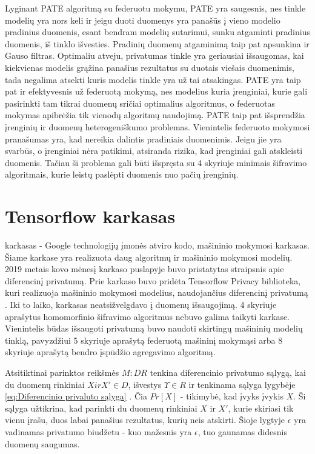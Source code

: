 \documentclass{VUMIFInfBakalaurinis}
\begin{document}
\par Lyginant PATE algoritmą su federuotu mokymu, PATE yra saugesnis, nes tinkle modelių yra nors keli ir jeigu duoti duomenys yra panašūs į vieno modelio pradinius duomenis, esant bendram modelių sutarimui, sunku atgaminti pradinius duomenis, iš tinklo išvesties. Pradinių duomenų atgaminimą taip pat apsunkina ir Gauso filtras. Optimaliu atveju, privatumas tinkle yra geriausiai išsaugomas, kai kiekvienas modelis grąžina panašius rezultatus su duotais viešais duomenimis, tada negalima atsekti kuris modelis tinkle yra už tai atsakingas. PATE yra taip pat ir efektyvesnis už federuotą mokymą, nes modelius kuria įrenginiai, kurie gali pasirinkti tam tikrai duomenų sričiai optimalius algoritmus, o federuotas mokymas apibrėžia tik vienodų algoritmų naudojimą. PATE taip pat išsprendžia įrenginių ir duomenų heterogeniškumo problemas. Vienintelis federuoto mokymosi pranašumas yra, kad nereikia dalintis pradiniais duomenimis. Jeigu jie yra svarbūs, o įrenginiai nėra patikimi, atsiranda rizika, kad įrenginiai gali atskleisti duomenis. Tačiau ši problema gali būti išspręsta su 4 skyriuje minimais šifravimo algoritmais, kurie leistų paslėpti duomenis nuo pačių įrenginių.

\section{Tensorflow karkasas}
\par {} karkasas - Google technologijų įmonės atviro kodo, mašininio mokymosi karkasas. Šiame karkase yra realizuota daug algoritmų ir mašininio mokymosi modelių. 2019 metais kovo mėnesį  karkaso puslapyje buvo pristatytas straipsnis apie diferencinį privatumą. Prie  karkaso buvo pridėta Tensorflow Privacy biblioteka, kuri realizuoja mašininio mokymosi modelius, naudojančius diferencinį privatumą \cite{29}. Iki to laiko,  karkasas neatsižvelgdavo į duomenų išsaugojimą. 4 skyriuje aprašytus homomorfinio šifravimo algoritmus nebuvo galima taikyti karkase. Vienintelis būdas išsaugoti privatumą buvo naudoti skirtingų mašininių modelių tinklą, pavyzdžiui 5 skyriuje aprašytą federuotą mašininį mokymąsi arba 8 skyriuje aprašytą bendro įspūdžio agregavimo algoritmą.
\par Atsitiktinai parinktos reikšmės $M : D $\rightarrow$ R$ tenkina diferencinio privatumo sąlygą, kai du duomenų rinkiniai $X ir X' \in D$, išvestys $\Upsilon \in R$ ir tenkinama sąlyga lygybėje \ref{eq:Diferencinio privaluto sąlyga} \cite{30}. Čia $Pr[X]$ - tikimybė, kad įvyks įvykis $X$. Ši sąlyga užtikrina, kad parinkti du duomenų rinkiniai $X$ ir $X'$, kurie skiriasi tik vienu įrašu, duos labai panašius rezultatus, kurių neis atskirti. Šioje lygtyje $\epsilon$ yra vadinamas privatumo biudžetu - kuo mažesnis yra $\epsilon$, tuo gaunamas didesnis duomenų saugumas.
\end{document}
